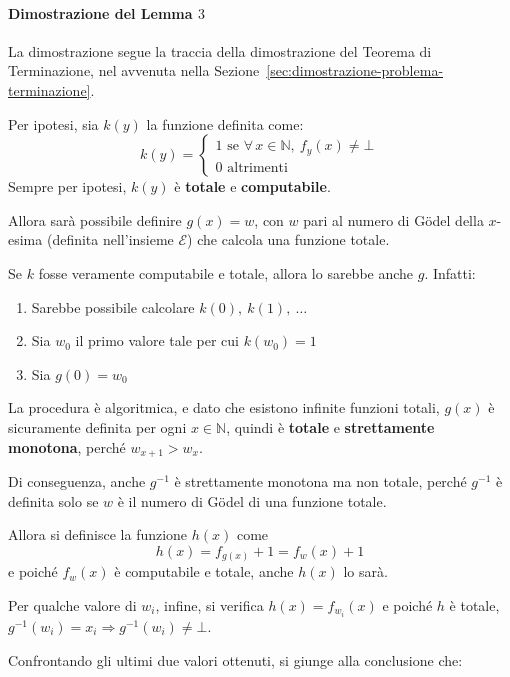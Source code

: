 \documentclass[italian, 10pt]{article}
\begin{document}
\paragraph[Dimostrazione del Lemma 3]{Dimostrazione del Lemma \(3\)}

La dimostrazione segue la traccia della dimostrazione del Teorema di Terminazione, nel avvenuta nella Sezione~\ref{sec:dimostrazione-problema-terminazione}.

Per ipotesi, sia \(k(y)\) la funzione definita come:
\[ k(y) =
  \begin{cases}
    1 \text{ se } \forall \, x \in \mathbb{N}, \ f_y(x) \neq \bot \\
    0 \text{ altrimenti }
  \end{cases}
\]
Sempre per ipotesi, \(k(y)\) è \textbf{totale} e \textbf{computabile}.

Allora sarà possibile definire \(g(x) = w\), con \(w\) pari al numero di Gödel della \(x\)-esima \TM (definita nell'insieme \(\mathscr{E}\)) che calcola una funzione totale.

Se \(k\) fosse veramente computabile e totale, allora lo sarebbe anche \(g\).
Infatti:

\begin{enumerate}
  \item Sarebbe possibile calcolare \(k(0),\ k(1),\ \ldots\)
  \item Sia \(w_0\) il primo valore tale per cui \(k(w_0) = 1\)
  \item Sia \(g(0) = w_0\)
\end{enumerate}

La procedura è algoritmica, e dato che esistono infinite funzioni totali, \(g(x)\) è sicuramente definita per ogni \(x \in \mathbb{N}\), quindi è \textbf{totale} e \textbf{strettamente monotona}, perché \(w_{x+1} > w_x\).

Di conseguenza, anche \(g^{-1}\) è strettamente monotona ma non totale, perché \(g^{-1}\) è definita solo se \(w\) è il numero di Gödel di una funzione totale.

Allora si definisce la funzione \(h(x)\) come
\[ h(x) = f_{g(x)} + 1 = f_w(x) + 1 \]
e poiché \(f_w(x)\) è computabile e totale, anche \(h(x)\) lo sarà.

Per qualche valore di \(w_i\), infine, si verifica \(h(x) = f_{w_i}(x)\) e poiché \(h\) è totale, \(g^{-1}(w_i) = x_i \Rightarrow g^{-1}(w_i) \neq \bot\).

Confrontando gli ultimi due valori ottenuti, si giunge alla conclusione che:
\end{document}
